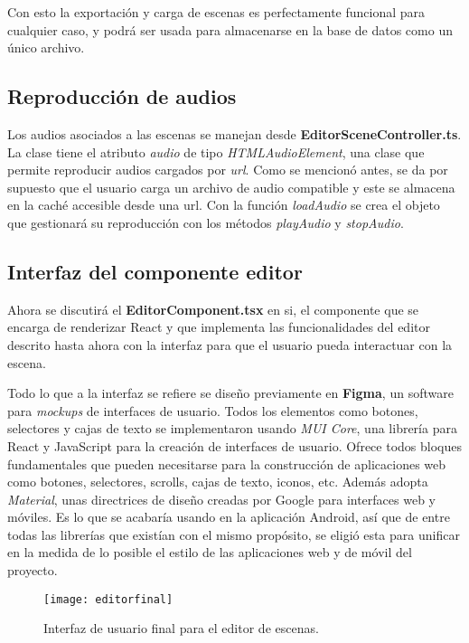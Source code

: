 Con esto la exportación y carga de escenas es perfectamente funcional para cualquier caso, y podrá ser usada para almacenarse en la base de datos como un único archivo.

\subsection{Reproducción de audios}

Los audios asociados a las escenas se manejan desde \textbf{EditorSceneController.ts}. La clase tiene el atributo \textit{audio} de tipo \textit{HTMLAudioElement}, una clase que permite reproducir audios cargados por \textit{url}. Como se mencionó antes, se da por supuesto que el usuario carga un archivo de audio compatible y este se almacena en la caché accesible desde una url. Con la función \textit{loadAudio} se crea el objeto que gestionará su reproducción con los métodos \textit{playAudio} y \textit{stopAudio}.

\subsection{Interfaz del componente editor}

Ahora se discutirá el \textbf{EditorComponent.tsx} en si, el componente que se encarga de renderizar React y que implementa las funcionalidades del editor descrito hasta ahora con la interfaz para que el usuario pueda interactuar con la escena.

Todo lo que a la interfaz se refiere se diseño previamente en \textbf{Figma}\cite{figma}, un software para \textit{mockups} de interfaces de usuario. Todos los elementos como botones, selectores y cajas de texto se implementaron usando \textit{MUI Core}, una librería para React y JavaScript para la creación de interfaces de usuario. Ofrece todos bloques fundamentales que pueden necesitarse para la construcción de aplicaciones web como botones, selectores, scrolls, cajas de texto, iconos, etc. Además adopta \textit{Material}, unas directrices de diseño creadas por Google para interfaces web y móviles. Es lo que se acabaría usando en la aplicación Android, así que de entre todas las librerías que existían con el mismo propósito, se eligió esta para unificar en la medida de lo posible el estilo de las aplicaciones web y de móvil del proyecto.

\begin{figure}[h]
    \centering
    \texttt{[image: editorfinal]}
    \caption[Interfaz de usuario para el editor de escenas]{Interfaz de usuario final para el editor de escenas.}
\end{figure}

